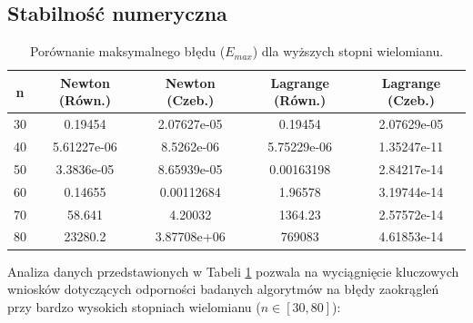 \documentclass{article}
\begin{document}
\subsection{Stabilność numeryczna}
\begin{table}[htbp]
\centering
\caption{Porównanie maksymalnego błędu ($E_{max}$) dla wyższych stopni wielomianu.}
\label{tab:max_error_high}
\begin{tabular}{@{}ccccc@{}}
\toprule
\textbf{n} & \textbf{Newton (Równ.)} & \textbf{Newton (Czeb.)} & \textbf{Lagrange (Równ.)} & \textbf{Lagrange (Czeb.)} \\ \midrule
30          & 0.19454                 & 2.07627e-05             & 0.19454                   & 2.07629e-05              \\
40          & 5.61227e-06             & 8.5262e-06              & 5.75229e-06               & 1.35247e-11              \\
50          & 3.3836e-05              & 8.65939e-05             & 0.00163198                & 2.84217e-14              \\
60          & 0.14655                 & 0.00112684              & 1.96578                   & 3.19744e-14              \\
70          & 58.641                  & 4.20032                 & 1364.23                   & 2.57572e-14              \\
80          & 23280.2                 & 3.87708e+06              & 769083                   & 4.61853e-14              \\ \bottomrule
\end{tabular}
\end{table}

Analiza danych przedstawionych w Tabeli \ref{tab:max_error_high} pozwala na wyciągnięcie kluczowych wniosków dotyczących odporności badanych algorytmów na błędy zaokrągleń przy bardzo wysokich stopniach wielomianu ($n \in [30, 80]$):
\end{document}
